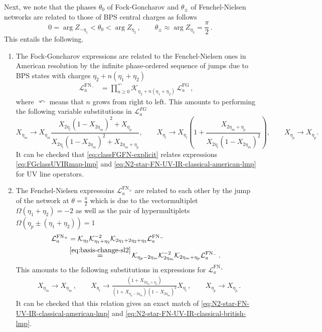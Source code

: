 \documentclass{article}
\numberwithin{equation}{section}
\newcommand{\FG}{\mathrm{FG}}
\newcommand{\FN}{\mathrm{FN}}
\def\be{\begin{equation}}
\def\ee{\end{equation}}
\def\CL{\mathcal{L}}
\begin{document}
Next, we note that the phases $\theta_0$ of Fock-Goncharov and $\theta_\pm$ of Fenchel-Nielsen networks are related to those of BPS central charges as follows
\be
	0=\arg Z_{-\eta_1} < \theta_0 <\arg Z_{\eta_2} \,,
	\qquad
	\theta_\pm \approx \arg Z_{\eta_3} = \frac{\pi}{2}\,.
\ee
This entails the following.
\begin{enumerate}[label=(\arabic*)]
    \item The Fock-Goncharov expressions are related to the Fenchel-Nielsen ones in American resolution by the infinite phase-ordered sequence of jumps due to BPS states with charges $\eta_2+n(\eta_1+\eta_2)$
    \begin{equation}      \label{eq:classFGFN}
    \begin{split}
   	    \CL_a^{\FN_-}
	    & = \prod_{n\geq 0}^{\curvearrowleft} \mathcal{K}_{\eta_2+n(\eta_1+\eta_2)} \, 	\CL_a^{\FG}\,,
    \end{split}
    \end{equation}
    where $\curvearrowleft$ means that $n$ grows from right to left.
    This amounts to performing the following variable substitutions in $\CL_a^{FG}$
    \be\label{eq:classFGFN-explicit}
    	X_{\eta_m} \to X_{\eta_m}  \frac{X_{2\eta_l} (1-X_{2\eta_m} )^2+X_{\eta_p} }{X_{2\eta_l} (1-X_{2\eta_m} )^2+X_{2\eta_m+\eta_p} }
        ,
	\qquad
	X_{\eta_l} \to X_{\eta_l}\left(
	1+\frac{X_{2\eta_m+\eta_p}}{X_{2\eta_l} (1-X_{2\eta_m} )^2}\right),
	\qquad
	X_{\eta_p} \to X_{\eta_p}.
    \ee
    It can be checked that \eqref{eq:classFGFN-explicit} relates expressions \eqref{eq:FGclassUVIRmap-lmp} and \eqref{eq:N2-star-FN-UV-IR-classical-american-lmp} for UV line operators.
    
    \item 
    The Fenchel-Nielsen expressoins $\CL_a^{\FN_\pm}$ are related to each other by the jump of the network at $\theta=\frac{\pi}{2}$ which is due to the vectormultiplet $\Omega(\eta_1+\eta_2)=-2$ as well as the pair of hypermultiplets $\Omega(\eta_p \pm (\eta_1+\eta_2)) = 1$
\begin{equation}\label{eq:FN-jump-classical}
    \begin{split}
        \CL_{a}^{\FN_+} & = \mathcal{K}_{\eta_3} \mathcal{K}_{\eta_1+\eta_2}^{-2}\mathcal{K}_{2\eta_1+2\eta_2+\eta_3} \CL_{a}^{\FN_-} 
        \\
        & \mathop{=}^{\eqref{eq:basis-change-sl2}} \mathcal{K}_{\eta_p-2\eta_m} \mathcal{K}_{2\eta_m }^{-2}\mathcal{K}_{2\eta_m +\eta_p} \CL_{a}^{\FN_-}\,.
    \end{split}
\end{equation}
This amounts to the following substitutions in expressions for $\CL_a^{\FN_+}$ 
\be\label{eq:classical-FN-jump-explicit}
\begin{split}
	&
	X_{\eta_m } \to  X_{\eta_m } 
	\,,
	\qquad
	X_{\eta_l} \to 
	\frac{
	(1+X_{2\eta_m+\eta_p })}{(1+X_{\eta_p-2\eta_m } )^{} 
	(1-X_{2\eta_m } )^{2}
	}  X_{\eta_l} 
	\,,
	\qquad
	X_{\eta_p} \to X_{\eta_p} 
	\,.
\end{split}
\ee
It can be checked that this relation gives an exact match of \eqref{eq:N2-star-FN-UV-IR-classical-american-lmp} and \eqref{eq:N2-star-FN-UV-IR-classical-british-lmp}.


\end{enumerate}
\end{document}
